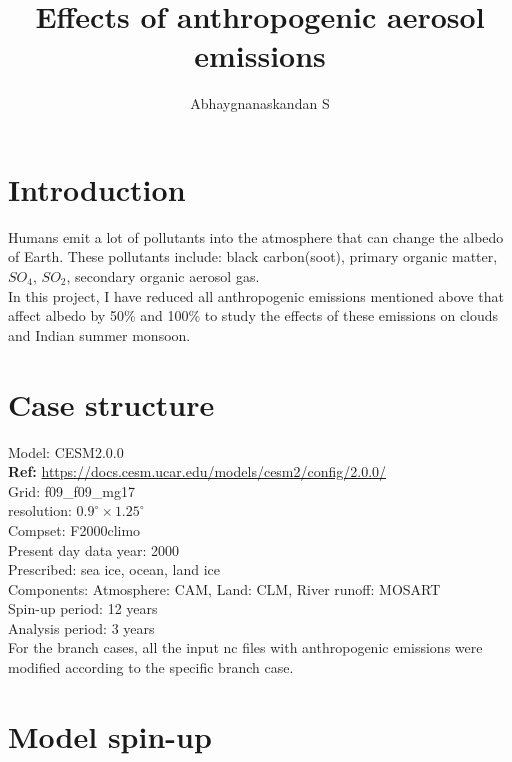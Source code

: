 \documentclass{article}
\author{Abhaygnanaskandan S}
\title{Effects of anthropogenic aerosol emissions}
\date{\vspace{-5ex}}
\begin{document}
\maketitle

\vspace{2em}

\section{Introduction}
\indent Humans emit a lot of pollutants into the atmosphere that can change the albedo of Earth. These pollutants include: black carbon(soot), primary organic matter, $SO_{4}$, $SO_{2}$, secondary organic aerosol gas.\\

\indent In this project, I have reduced all anthropogenic emissions mentioned above that affect albedo by 50\% and 100\% to study the effects of these emissions on clouds and Indian summer monsoon.\\

\section{Case structure}
 Model: CESM2.0.0\\
 \indent \textbf{Ref:} \url{https://docs.cesm.ucar.edu/models/cesm2/config/2.0.0/}\\
 
 Grid: f09\_f09\_mg17\\
 \indent resolution: $0.9^\circ \times 1.25^\circ$\\
 
 Compset: F2000climo\\
 \indent Present day data year: 2000\\ 
 \indent Prescribed: sea ice, ocean, land ice\\
 \indent Components: Atmosphere: CAM, Land: CLM, River runoff: MOSART\\

 Spin-up period: 12 years\\
 Analysis period: 3 years\\

 \indent For the branch cases, all the input nc files with anthropogenic emissions were modified according to the specific branch case.\\

\section{Model spin-up}
\end{document}
